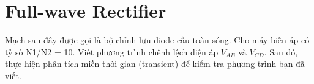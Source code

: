 \section{Full-wave Rectifier}
Mạch sau đây được gọi là bộ chỉnh lưu diode cầu toàn sóng. Cho máy biến áp có tỷ số N1/N2 = 10. Viết phương trình chênh lệch điện áp \(V_{AB}\) và \(V_{CD}\).
Sau đó, thực hiện phân tích miền thời gian (transient) để kiểm tra phương trình bạn đã viết.